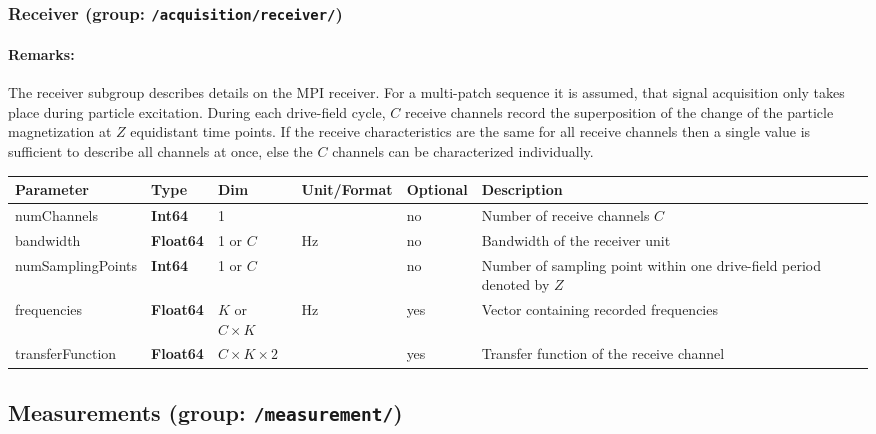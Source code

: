 \documentclass[landscape]{article} %
\newcommand{\inl}[1]{\lstinline[columns=fixed]{#1}}
\newcommand{\inltab}[1]{{\ttfamily\bfseries\color{blue}#1}}
\newcommand{\inlvar}[1]{{\ttfamily#1}}
\begin{document}
\subsubsection{Receiver (group: \inl{/acquisition/receiver/})}

\begin{multicols}{2}

\paragraph{Remarks:} The receiver subgroup describes details on the MPI receiver. For a multi-patch sequence it is assumed, that signal acquisition only takes place during particle excitation. During each drive-field cycle, $C$ receive channels record the superposition of the change of the particle magnetization at $Z$ equidistant time points. If the receive characteristics are the same for all receive channels then a single value is sufficient to describe all channels at once, else the $C$ channels can be characterized individually.

\end{multicols}


\noindent \begin{tabularx}{\columnwidth}{lllllX} 
\textbf{Parameter} & \textbf{Type} & \textbf{Dim} & \textbf{Unit/Format} & \textbf{Optional} & \textbf{Description} \\ \hline 
\inlvar{numChannels} & \inltab{Int64} & 1 & & no & Number of receive channels $C$ \\ \hline 
\inlvar{bandwidth} & \inltab{Float64} & 1 or $C$ & Hz & no & Bandwidth of the receiver unit \\ \hline
\inlvar{numSamplingPoints} & \inltab{Int64} & 1 or $C$ &  & no & Number of sampling point within one drive-field period denoted by $Z$ \\ \hline
\inlvar{frequencies} & \inltab{Float64} & $K$ or $C\times K$ & Hz & yes & Vector containing recorded frequencies \\ \hline
\inlvar{transferFunction} & \inltab{Float64} & $C \times K \times 2$ &  & yes & Transfer function of the receive channel \\ \hline
\end{tabularx}


\subsection{Measurements (group: \inl{/measurement/})}
\end{document}
